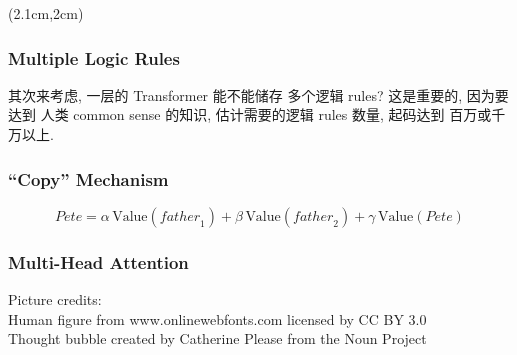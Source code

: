 \begin{preview}
\begin{minipage}{\textwidth}
	
\setlength{\parskip}{0.4\baselineskip}
\begin{textblock*}{20cm}(2.1cm,2cm) %
	{}
	\hspace{8cm}
\end{textblock*}

\vspace*{0.3cm} 

\subsubsection{Multiple Logic Rules}

其次来考虑, 一层的 Transformer 能不能储存 多个逻辑 rules?  这是重要的, 因为要达到 人类 common sense 的知识, 估计需要的逻辑 rules 数量, 起码达到 百万或千万以上.



\subsubsection{``Copy'' Mechanism}

\begin{equation}
\mathit{Pete} = \alpha \, \mbox{Value}(\mathit{father}_1) + \beta \, \mbox{Value}(\mathit{father}_2) + \gamma \, \mbox{Value}(\mathit{Pete})
\end{equation}

\subsubsection{Multi-Head Attention}

\footnotesize
Picture credits:\\
Human figure from www.onlinewebfonts.com licensed by CC BY 3.0\\
Thought bubble created by Catherine Please from the Noun Project
\end{minipage}
\end{preview}

